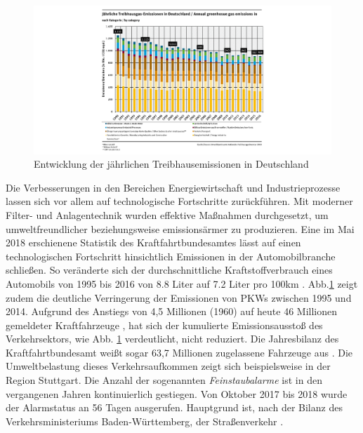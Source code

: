 \begin{figure}[ht]
	\includegraphics[width=\textwidth]{images/jaehrlicheTreibhausEmissionen.png}
	\caption{Entwicklung der jährlichen Treibhausemissionen in Deutschland}
	\label{fig3}
\end{figure}

Die Verbesserungen in den Bereichen Energiewirtschaft und Industrieprozesse lassen sich vor allem auf technologische Fortschritte zurückführen. Mit moderner Filter- und Anlagentechnik wurden effektive Maßnahmen durchgesetzt, um umweltfreundlicher beziehungsweise emissionsärmer zu produzieren. Eine im Mai 2018 erschienene Statistik des Kraftfahrtbundesamtes lässt auf einen technologischen Fortschritt hinsichtlich Emissionen in der Automobilbranche schließen. So veränderte sich der durchschnittliche Kraftstoffverbrauch eines Automobils von 1995 bis 2016 von 8.8 Liter auf 7.2 Liter pro 100km \citep[vgl.][]{Umweltbundesamt.2018}. Abb.\ref{fig3} zeigt zudem die deutliche Verringerung der Emissionen von PKWs zwischen 1995 und 2014. Aufgrund des Anstiegs von 4,5 Millionen (1960) auf heute 46 Millionen gemeldeter Kraftfahrzeuge \citep[vgl.][]{StatistaDasStatistikPortal.2018}, hat sich der kumulierte Emissionsausstoß des Verkehrsektors, wie Abb. \ref{fig3} verdeutlicht, nicht reduziert. Die Jahresbilanz des Kraftfahrtbundesamt weißt sogar 63,7 Millionen zugelassene Fahrzeuge aus \citep[vgl.][]{KBA.2018}. Die Umweltbelastung dieses Verkehrsaufkommen zeigt sich beispielsweise in der Region Stuttgart. Die Anzahl der sogenannten \emph{Feinstaubalarme} ist in den vergangenen Jahren kontinuierlich gestiegen. Von Oktober 2017 bis 2018 wurde der Alarmstatus an 56 Tagen ausgerufen. Hauptgrund ist, nach der Bilanz des Verkehrsministeriums Baden-Württemberg, der Straßenverkehr \citep[vgl.][]{MinisteriumfurVerkehrBadenWurttemberg.2018}.

